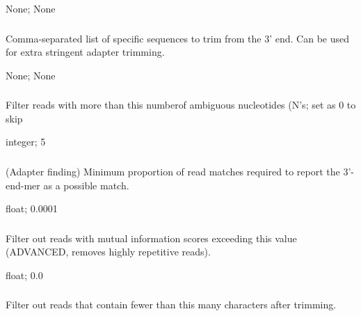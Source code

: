 \documentclass[letterpaper,11pt,english]{sphinxmanual}
\begin{document}
 None;  None


\subsubsection{}
\label{\detokenize{prog_desc:z-trim-pattern-3}}
 Comma-separated list of specific sequences to trim from the 3’ end. Can be used for extra stringent adapter trimming.

 None;  None


\subsubsection{}
\label{\detokenize{prog_desc:a-filter-ambig}}
 Filter reads with more than this numberof ambiguous nucleotides (N’s; set as 0 to skip

 integer;  5


\subsubsection{}
\label{\detokenize{prog_desc:e-adapter-end-min-match}}
 (Adapter finding) Minimum proportion of read matches required to report the 3’-end-mer as a possible match.

 float;  0.0001


\subsubsection{}
\label{\detokenize{prog_desc:i-filter-low-info}}
 Filter out reads with mutual information scores exceeding this value (ADVANCED, removes highly repetitive reads).

 float;  0.0


\subsubsection{}
\label{\detokenize{prog_desc:l-filter-length}}
 Filter out reads that contain fewer than this many characters after trimming.
\end{document}
